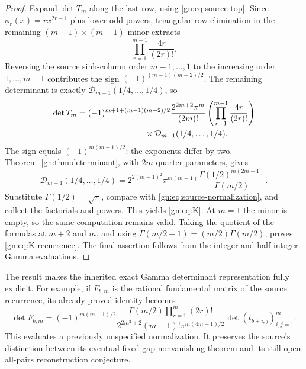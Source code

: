 \begin{proof}
Expand $\det T_m$ along the last row, using
\eqref{gn:eq:source-top}.  Since
$\phi_r(x)=rx^{2r-1}$ plus lower odd powers, triangular row elimination
in the remaining $(m-1)\times(m-1)$ minor extracts
\[
                  \prod_{r=1}^{m-1}\frac{4r}{(2r)!}.
\]
Reversing the source sinh-column order $m-1,\ldots,1$ to the increasing
order $1,\ldots,m-1$ contributes the sign
$(-1)^{(m-1)(m-2)/2}$.  The remaining determinant is exactly
$\mathcal D_{m-1}(1/4,\ldots,1/4)$, so
\begin{equation}\label{gn:eq:detT-factorization}
\begin{split}
 \det T_m={}&(-1)^{m+1+(m-1)(m-2)/2}
 \frac{2^{2m+2}\pi^m}{(2m)!}
   \left(\prod_{r=1}^{m-1}\frac{4r}{(2r)!}\right)\\
 &\hspace{24mm}\times\mathcal D_{m-1}(1/4,\ldots,1/4).
\end{split}
\end{equation}
The sign equals $(-1)^{m(m-1)/2}$: the exponents differ by two.
Theorem~\ref{gn:thm:determinant}, with $2m$ quarter parameters, gives
\begin{equation}\label{gn:eq:quarter-minor}
 \mathcal D_{m-1}(1/4,\ldots,1/4)
 =2^{2(m-1)^2}\pi^{m(m-1)}
       \frac{\Gamma(1/2)^{m(2m-1)}}{\Gamma(m/2)}.
\end{equation}
Substitute $\Gamma(1/2)=\sqrt\pi$, compare with
\eqref{gn:eq:source-normalization}, and collect the factorials and
powers.  This yields \eqref{gn:eq:K}.  At $m=1$ the minor is empty,
so the same computation remains valid.  Taking the quotient of the
formulas at $m+2$ and $m$, and using
$\Gamma(m/2+1)=(m/2)\Gamma(m/2)$, proves
\eqref{gn:eq:K-recurrence}.  The final assertion follows from the
integer and half-integer Gamma evaluations.
\end{proof}

The result makes the inherited exact Gamma determinant representation
fully explicit.  For example, if $F_{b,m}$ is the rational fundamental
matrix of the source recurrence, its already proved identity becomes
\begin{equation}\label{gn:eq:F-explicit}
 \det F_{b,m}
 =(-1)^{m(m-1)/2}
   \frac{\Gamma(m/2)\prod_{r=1}^m(2r)!}
        {2^{2m^2+2}(m-1)!\pi^{m(4m-1)/2}}
       \det(t_{b+i,j})_{i,j=1}^m.
\end{equation}
This evaluates a previously unspecified normalization.  It preserves
the source's distinction between its eventual fixed-gap nonvanishing
theorem and its still open all-pairs reconstruction conjecture.

